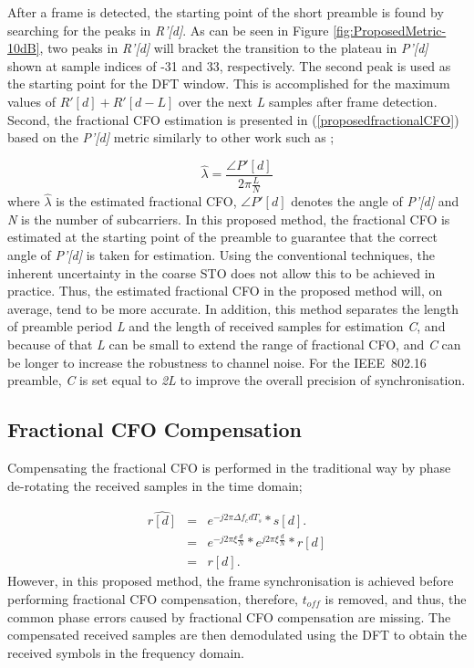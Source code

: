 After a frame is detected, the starting point of the short preamble is found by searching for the peaks in \emph{R'[d]}.
As can be seen in Figure \ref{fig:ProposedMetric-10dB}, two peaks in \emph{R'[d]} will bracket the transition to the plateau in \emph{P'[d]} shown at sample indices of -31 and 33, respectively.
The second peak is used as the starting point for the DFT window.
This is accomplished for the maximum values of $R'[d] + R'[d - L]$ over the next \emph{L} samples after frame detection.
Second, the fractional CFO estimation is presented in (\ref{proposedfractionalCFO}) based on the \emph{P'[d]} metric similarly to other work such as \cite{Schmidl1997,Schwoerer2002,Manavi2004,Guffey2007,Huang2010,Recio2010};

\begin{equation}
\label{proposedfractionalCFO}
\hat{\lambda} = \frac{\angle P'[d]}{2\pi \frac{L}{N}}
\end{equation}
where $\hat{\lambda}$ is the estimated fractional CFO, $\angle P'[d]$ denotes the angle of \emph{P'[d]} and \emph{N} is the number of subcarriers.
In this proposed method, the fractional CFO is estimated at the starting point of the preamble to guarantee that the correct angle of \emph{P'[d]} is taken for estimation. Using the conventional techniques, the inherent uncertainty in the coarse STO does not allow this to be achieved in practice.
Thus, the estimated fractional CFO in the proposed method will, on average, tend to be more accurate.
In addition, this method separates the length of preamble period \emph{L} and the length of received samples for estimation \emph{C}, and because of that \emph{L} can be small to extend the range of fractional CFO, and \emph{C} can be longer to increase the robustness to channel noise. For the IEEE~802.16 preamble, \emph{C} is set equal to \emph{2L} to improve the overall precision of synchronisation.

\subsection{Fractional CFO Compensation}

Compensating the fractional CFO is performed in the traditional way by phase de-rotating the received samples in the time domain;

\begin{eqnarray}
\label{proposedcomfreoffsignal}
\widehat{r[d]} &=&  e^{-j2\pi\Delta f_{c}dT_{s}}*s[d]. \nonumber \\
&=&  e^{-j2\pi\xi \frac{d}{N}}*e^{j2\pi\xi \frac{d}{N}}*r[d] \nonumber \\
&=& r[d].
\end{eqnarray}
However, in this proposed method, the frame synchronisation is achieved before performing fractional CFO compensation, therefore, $t_{off}$ is removed, and thus, the common phase errors caused by fractional CFO compensation are missing.
The compensated received samples are then demodulated using the DFT to obtain the received symbols in the frequency domain.

